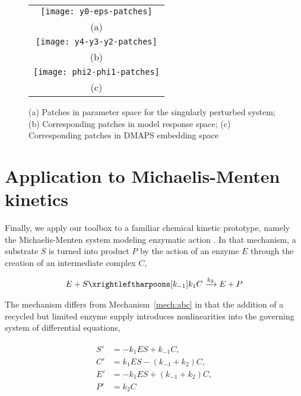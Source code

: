 \begin{figure}[!htp]
  \centering
  \begin{tabular}{c}
    \texttt{[image: y0-eps-patches]} \\
    (a)\\
    \texttt{[image: y4-y3-y2-patches]}\\
    (b)\\
    \texttt{[image: phi2-phi1-patches]}\\
    (c)\\
  \end{tabular}
  \caption[Different views of singularly perturbed system]{(a) Patches in parameter space for the singularly perturbed
    system; (b) Corresponding patches in model response space; (c)
    Corresponding patches in DMAPS embedding
    space \label{fig:singpert-patches}}
\end{figure}


\section{Application to Michaelis-Menten kinetics}

Finally, we apply our toolbox to a familiar chemical kinetic
prototype, namely the Michaelis-Menten system modeling enzymatic
action \cite{johnson_original_2011}.  In that mechanism, a substrate
$S$ is turned into product $P$ by the action of an enzyme $E$ through
the creation of an intermediate complex $C$,

\begin{align}
  E + S \xrightleftharpoons[k_{-1}]{k_1} C \xrightarrow[]{k_2} E + P
  \label{mech:mm}
\end{align}

The mechanism differs from Mechanism~\ref{mech:abc} in that the
addition of a recycled but limited enzyme supply introduces
nonlinearities into the governing system of differential equations,


\begin{align}
  \begin{split}
    S' &= -k_1 E S + k_{-1} C , \\
    C' &= k_1 E S - (k_{-1} + k_2) C , \\
    E' &= -k_1 E S + (k_{-1} + k_2) C , \\
    P' &= k_2 C
  \end{split}
\end{align}



